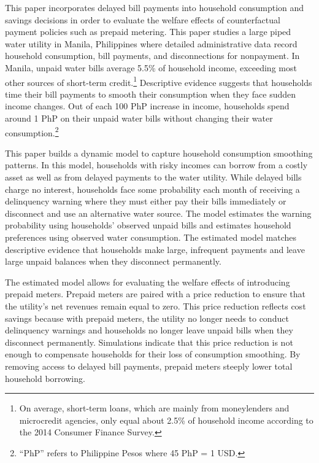 \documentclass[12pt,table]{article}
\begin{document}
This paper incorporates delayed bill payments into household consumption and savings decisions in order to evaluate the welfare effects of counterfactual payment policies such as prepaid metering.  This paper studies a large piped water utility in Manila, Philippines where detailed administrative data record household consumption, bill payments, and disconnections for nonpayment.  In Manila, unpaid water bills average 5.5\% of household income, exceeding most other sources of short-term credit.\footnote{On average, short-term loans, which are mainly from moneylenders and microcredit agencies, only equal about 2.5\% of household income according to the 2014 Consumer Finance Survey.}  Descriptive evidence suggests that households time their bill payments to smooth their consumption when they face sudden income changes.  Out of each 100 PhP increase in income, households spend around 1 PhP on their unpaid water bills without changing their water consumption.\footnote{``PhP'' refers to Philippine Pesos where 45 PhP = 1 USD.}

This paper builds a dynamic model to capture household consumption smoothing patterns.  In this model, households with risky incomes can borrow from a costly asset as well as from delayed payments to the water utility.  While delayed bills charge no interest, households face some probability each month of receiving a delinquency warning where they must either pay their bills immediately or disconnect and use an alternative water source.  The model estimates the warning probability using households' observed unpaid bills and estimates household preferences using observed water consumption.  The estimated model matches descriptive evidence that households make large, infrequent payments and leave large unpaid balances when they disconnect permanently.

The estimated model allows for evaluating the welfare effects of introducing prepaid meters.  Prepaid meters are paired with a price reduction to ensure that the utility's net revenues remain equal to zero.  This price reduction reflects cost savings because with prepaid meters, the utility no longer needs to conduct delinquency warnings and households no longer leave unpaid bills when they disconnect permanently.  Simulations indicate that this price reduction is not enough to compensate households for their loss of consumption smoothing.  By removing access to delayed bill payments, prepaid meters steeply lower total household borrowing.
\end{document}
